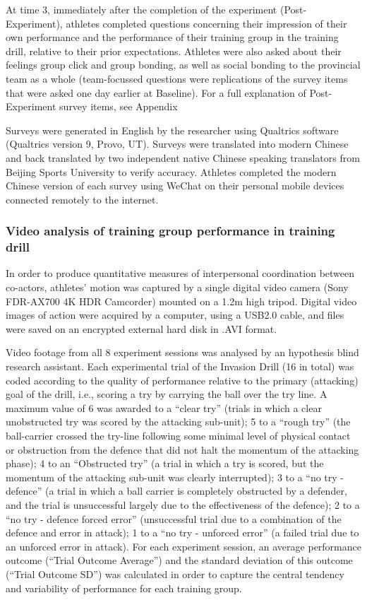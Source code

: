 At time 3, immediately after the completion of the experiment (Post-Experiment), athletes completed questions concerning their impression of their own performance and the performance of their training group in the training drill, relative to their prior expectations.  Athletes were also asked about their feelings group click and group bonding, as well as social bonding to the provincial team as a whole (team-focussed questions were replications of the survey items that were asked one day earlier at Baseline).  For a full explanation of Post-Experiment survey items, see Appendix

Surveys were generated in English by the researcher using Qualtrics software (Qualtrics version 9, Provo, UT). Surveys were translated into modern Chinese and back translated by two independent native Chinese speaking translators from Beijing Sports University to verify accuracy.  Athletes completed the modern Chinese version of each survey using WeChat on their personal mobile devices connected remotely to the internet.


\subsubsection{Video analysis of training group performance in training drill}
In order to produce quantitative measures of interpersonal coordination between co-actors, athletes’ motion was captured by a single digital video camera (Sony FDR-AX700 4K HDR Camcorder) mounted on a 1.2m high tripod. Digital video images of action were acquired by a computer, using a USB2.0 cable, and files were saved on an encrypted external hard disk in .AVI format.

Video footage from all 8 experiment sessions was analysed by an hypothesis blind research assistant.  Each experimental trial of the Invasion Drill (16 in total) was coded according to the quality of performance relative to the primary (attacking) goal of the drill, i.e., scoring a try by carrying the ball over the try line.  A maximum value of 6 was awarded to a ``clear try'' (trials in which a clear unobstructed try was scored by the attacking sub-unit); 5 to a ``rough try'' (the ball-carrier crossed the try-line following some minimal level of physical contact or obstruction from the defence that did not halt the momentum of the attacking phase); 4 to an ``Obstructed try'' (a trial in which a try is scored, but the momentum of the attacking sub-unit was clearly interrupted); 3 to a ``no try - defence''  (a trial in which a ball carrier is completely obstructed by a defender, and the trial is unsuccessful largely due to the effectiveness of the defence); 2 to a ``no try - defence forced error'' (unsuccessful trial due to a combination of the defence and error in attack); 1 to a ``no try - unforced error'' (a failed trial due to an unforced error in attack).
For each experiment session, an average performance outcome (``Trial Outcome Average'') and the standard deviation of this outcome (``Trial Outcome SD'') was calculated in order to capture the central tendency and variability of performance for each training group.

